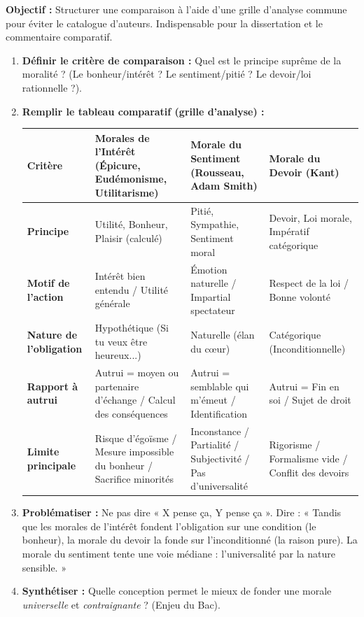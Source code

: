 \documentclass[11pt]{article}
\newcommand{\cle}[1]{{\popxbold\color{popdark}#1}}
\begin{document}
\begin{methode}
\textbf{Objectif :} Structurer une comparaison à l'aide d'une grille d'analyse commune pour éviter le catalogue d'auteurs. Indispensable pour la dissertation et le commentaire comparatif.
\begin{enumerate}
    \item \textbf{Définir le critère de comparaison :} Quel est le \cle{principe suprême} de la moralité ? (Le bonheur/intérêt ? Le sentiment/pitié ? Le devoir/loi rationnelle ?).
    \item \textbf{Remplir le tableau comparatif (grille d'analyse) :}
    \begin{center}
    \begin{tabularx}{\linewidth}{|l|X|X|X|}\hline
    \rowcolor{popblueL} \textbf{Critère} & \textbf{Morales de l'Intérêt} (Épicure, Eudémonisme, Utilitarisme) & \textbf{Morale du Sentiment} (Rousseau, Adam Smith) & \textbf{Morale du Devoir} (Kant) \\ \hline
    \textbf{Principe} & Utilité, Bonheur, Plaisir (calculé) & Pitié, Sympathie, Sentiment moral & Devoir, Loi morale, Impératif catégorique \\ \hline
    \textbf{Motif de l'action} & Intérêt bien entendu / Utilité générale & Émotion naturelle / Impartial spectateur & Respect de la loi / Bonne volonté \\ \hline
    \textbf{Nature de l'obligation} & Hypothétique (Si tu veux être heureux...) & Naturelle (élan du cœur) & Catégorique (Inconditionnelle) \\ \hline
    \textbf{Rapport à autrui} & Autrui = moyen ou partenaire d'échange / Calcul des conséquences & Autrui = semblable qui m'émeut / Identification & Autrui = Fin en soi / Sujet de droit \\ \hline
    \textbf{Limite principale} & Risque d'égoïsme / Mesure impossible du bonheur / Sacrifice minorités & Inconstance / Partialité / Subjectivité / Pas d'universalité & Rigorisme / Formalisme vide / Conflit des devoirs \\ \hline
    \end{tabularx}
    \end{center}
    \item \textbf{Problématiser :} Ne pas dire « X pense ça, Y pense ça ». Dire : « Tandis que les morales de l'intérêt fondent l'obligation sur une \cle{condition} (le bonheur), la morale du devoir la fonde sur l'\cle{inconditionné} (la raison pure). La morale du sentiment tente une voie médiane : l'universalité par la nature sensible. »
    \item \textbf{Synthétiser :} Quelle conception permet le mieux de fonder une morale \emph{universelle} et \emph{contraignante} ? (Enjeu du Bac).
\end{enumerate}
\end{methode}
\end{document}
